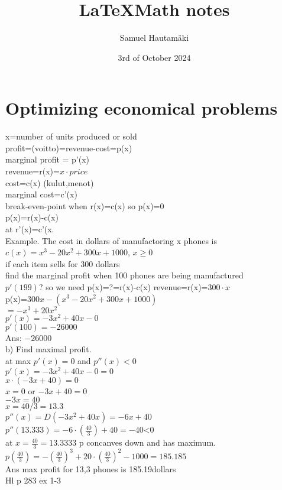 \documentclass{article}
\title{\LaTeX Math notes}
\author{Samuel Hautamäki}
\date{3rd of October 2024}
\begin{document}
  \maketitle
   
  \section{Optimizing economical problems}
  x=number of units produced or sold\\
  profit=(voitto)=revenue-cost=p(x)\\
  marginal profit = p'(x)\\
  revenue=r(x)=$x\cdot price$\\
  cost=c(x)  (kulut,menot)\\
  marginal cost=c'(x)\\
  break-even-point when r(x)=c(x) so p(x)=0\\
  p(x)=r(x)-c(x)\\
  at r'(x)=c'(x.\\
  Example. The cost in dollars of manufactoring x phones is $c(x)=x^3-20x^2+300x+1000$, $x\geq0$\\
  if each item sells for 300 dollars\\
  find the marginal profit when 100 phones are being manufactured\\
  $p'(199)?$ so we need p(x)=?=r(x)-c(x)
  revenue=r(x)=$300\cdot x$\\
  p(x)=$300x-(x^3-20x^2+300x+1000)$\\
  $=-x^3+20x^2$\\
  $p'(x)=-3x^2+40x-0$\\
  $p'(100)=-26000$\\
  Ans: $-26000$\\
  b) Find maximal profit.\\
  at max $p'(x)=0$ and $p''(x)<0$\\
  $p'(x)=-3x^2+40x-0=0$\\
  $x\cdot(-3x+40)=0$\\
  $x=0$ or $-3x+40=0$\\
  $-3x=40$\\
  $x=40/3=13.3$\\
  $p''(x)=D (-3x^2+40x)=-6x+40$\\
  $p''(13.333)=-6\cdot(\frac{40}{3})+40=-40$<0\\
  at $x=\frac{40}{3}=13.3333$ p concanves down and has maximum.\\
  $p(\frac{40}{3})=-(\frac{40}{3})^3+20\cdot(\frac{40}{3})^2-1000=185.185$\\
  Ans max profit for 13,3 phones is 185.19dollars\\
  Hl p 283 ex 1-3\\
\end{document}
